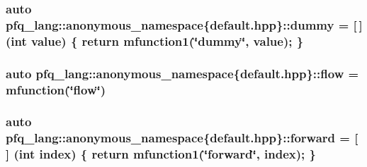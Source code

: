 \hypertarget{namespacepfq__lang_1_1anonymous__namespace_02default_8hpp_03_a876b4be1c6cf97e317f74242d8fb3da4}{
\subsubsection[{dummy}]{\setlength{\rightskip}{0pt plus 5cm}auto pfq\+\_\+lang\+::anonymous\+\_\+namespace\{default.\+hpp\}\+::dummy = \mbox{[}$\,$\mbox{]} (int value) \{ return {\bf mfunction1}(\char`\"{}dummy\char`\"{}, value); \}}}\label{namespacepfq__lang_1_1anonymous__namespace_02default_8hpp_03_a876b4be1c6cf97e317f74242d8fb3da4}
\hypertarget{namespacepfq__lang_1_1anonymous__namespace_02default_8hpp_03_a90497b962aed613834286418cd7ea722}{
\subsubsection[{flow}]{\setlength{\rightskip}{0pt plus 5cm}auto pfq\+\_\+lang\+::anonymous\+\_\+namespace\{default.\+hpp\}\+::flow = {\bf mfunction}(\char`\"{}flow\char`\"{})}}\label{namespacepfq__lang_1_1anonymous__namespace_02default_8hpp_03_a90497b962aed613834286418cd7ea722}
\hypertarget{namespacepfq__lang_1_1anonymous__namespace_02default_8hpp_03_a7fbe4b2614dd240727bf1696b4d06523}{
\subsubsection[{forward}]{\setlength{\rightskip}{0pt plus 5cm}auto pfq\+\_\+lang\+::anonymous\+\_\+namespace\{default.\+hpp\}\+::forward = \mbox{[}$\,$\mbox{]} (int index) \{ return {\bf mfunction1}(\char`\"{}forward\char`\"{}, index); \}}}\label{namespacepfq__lang_1_1anonymous__namespace_02default_8hpp_03_a7fbe4b2614dd240727bf1696b4d06523}
